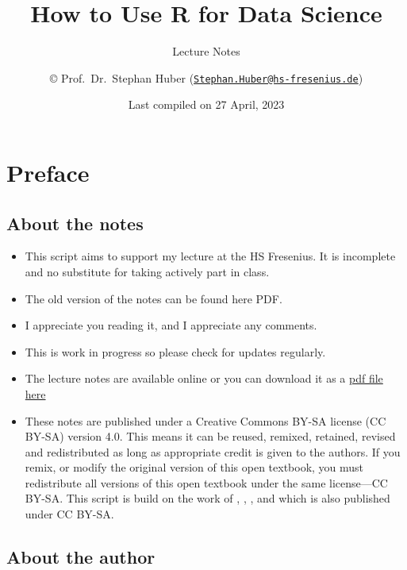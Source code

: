 \documentclass[
  12pt,
  oneside]{book}
\title{How to Use R for Data Science}
\subtitle{Lecture Notes}
\author{© Prof.~Dr.~Stephan Huber (\href{mailto:Stephan.Huber@hs-fresenius.de}{\nolinkurl{Stephan.Huber@hs-fresenius.de}})}
\date{Last compiled on 27 April, 2023}
\providecommand{\tightlist}{%
  \setlength{\itemsep}{0pt}\setlength{\parskip}{0pt}}
\theoremstyle{definition}
\theoremstyle{definition}
\theoremstyle{definition}
\theoremstyle{definition}
\theoremstyle{remark}
\begin{document}
\maketitle

{
\hypersetup{linkcolor=}
\setcounter{tocdepth}{2}
\tableofcontents
}
\hypertarget{preface}{%
\chapter*{Preface}\label{preface}}

\hypertarget{about-the-notes}{%
\section*{About the notes}\label{about-the-notes}}

\begin{itemize}
\tightlist
\item
  This script aims to support my lecture at the HS Fresenius. It is incomplete and no substitute for taking actively part in class.
\item
  The old version of the notes can be found here PDF.
\item
  I appreciate you reading it, and I appreciate any comments.
\item
  This is work in progress so please check for updates regularly.
\item
  The lecture notes are available online or you can download it as a \href{https://raw.githubusercontent.com/hubchev/hubchev.github.io/main/ds/_main.pdf}{pdf file here}
\item
  These notes are published under a Creative Commons BY-SA license (CC BY-SA) version 4.0. This means it can be reused, remixed, retained, revised and redistributed as long as appropriate credit is given to the authors. If you remix, or modify the original version of this open textbook, you must redistribute all versions of this open textbook under the same license---CC BY-SA. This script is build on the work of \citet{Navarro2020Learning}, \citet{Muschelli2022Introduction}, \citet{Thulin2021Modern}, and \citet{Ismay2022Statistical} which is also published under CC BY-SA.
\end{itemize}

\hypertarget{about-the-author}{%
\section*{About the author}\label{about-the-author}}
\end{document}
